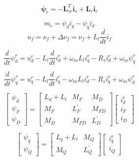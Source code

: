 \documentclass{article}
\theoremstyle{scsthe}
\begin{document}
\begin{equation} \label{eq:lim_dependent_branch}
{\mathbf \psi}_{r} = -{\mathbf L}^T_{sr} {\mathbf i}_{s}+{\mathbf L}_{r} {\mathbf i}_{r}
\end{equation}

\begin{equation} \label{eq:lim_dependent_branch}
m_{e} = \psi_{d} i_{q}-\psi_{q} i_{d}
\end{equation}
\begin{equation}  \label{eq:sync1}
u_f = \nu_f + \Delta \nu_f = \nu_f + L_l \frac{d}{dt} i_f
\end{equation}


\begin{equation}  \label{eq:sync2}
\frac{d}{dt} \psi^r_d = u^r_d - L_l \frac{d}{dt} i^r_d + \omega_m L_l i^r_q - R_s i^r_d + \omega_m \psi^r_q
\end{equation}


\begin{equation}  \label{eq:sync3}
\frac{d}{dt} \psi^r_q = u^r_q - L_l \frac{d}{dt} i^r_q - \omega_m L_l i^r_d - R_s i^r_q + \omega_m \psi^r_d
\end{equation}


\begin{equation} \label{eq:sync4}
\begin{bmatrix}
\psi_d \\
\psi_F \\
\psi_D
\end{bmatrix}
= 
\begin{bmatrix}
L_d + L_l  &  M_F        &  M_D     \\
M_F        &  L^{'}_{F}  &  M_{FD}  \\
M_D        &  M_{FD}     &  L^{'}_D  
\end{bmatrix}
\begin{bmatrix}
i^r_d \\
i_F   \\
i_D   
\end{bmatrix}
\end{equation}

\begin{equation} \label{eq:sync5}
\begin{bmatrix}
\psi_q \\
\psi_Q
\end{bmatrix}
= 
\begin{bmatrix}
L_q + L_l  &  M_Q       \\   
M_Q        &  L^{'}_{Q}
\end{bmatrix}
\begin{bmatrix}
i^r_q \\
i_Q   
\end{bmatrix}
\end{equation}
\end{document}
